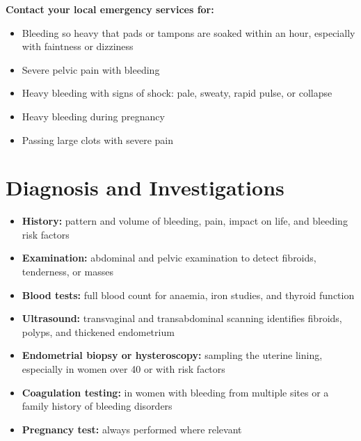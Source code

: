 \textbf{Contact your local emergency services for:}
\begin{itemize}
    \item Bleeding so heavy that pads or tampons are soaked within an hour, especially with faintness or dizziness
    \item Severe pelvic pain with bleeding
    \item Heavy bleeding with signs of shock: pale, sweaty, rapid pulse, or collapse
    \item Heavy bleeding during pregnancy
    \item Passing large clots with severe pain
\end{itemize}

\section*{Diagnosis and Investigations}
\begin{itemize}
    \item \textbf{History:} pattern and volume of bleeding, pain, impact on life, and bleeding risk factors
    \item \textbf{Examination:} abdominal and pelvic examination to detect fibroids, tenderness, or masses
    \item \textbf{Blood tests:} full blood count for anaemia, iron studies, and thyroid function
    \item \textbf{Ultrasound:} transvaginal and transabdominal scanning identifies fibroids, polyps, and thickened endometrium
    \item \textbf{Endometrial biopsy or hysteroscopy:} sampling the uterine lining, especially in women over 40 or with risk factors
    \item \textbf{Coagulation testing:} in women with bleeding from multiple sites or a family history of bleeding disorders
    \item \textbf{Pregnancy test:} always performed where relevant
\end{itemize}

